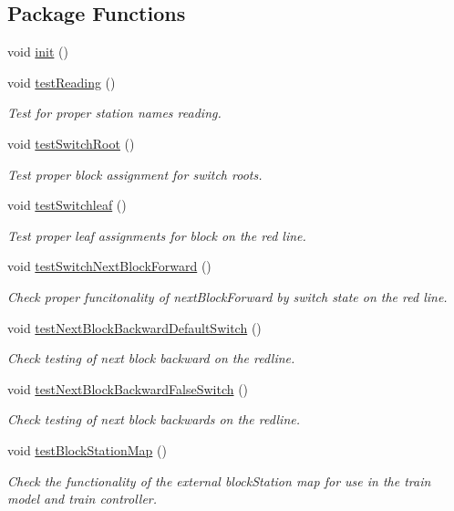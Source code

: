 \subsection*{Package Functions}
\begin{DoxyCompactItemize}
\item 
void \hyperlink{classTrackModelTest_1_1RedlineTest_a497f6628deb6bfcdacf364347d91a047}{init} ()
\item 
void \hyperlink{classTrackModelTest_1_1RedlineTest_ae4dcd25f8b5aa3ad7b8dc6ba5653fdab}{test\+Reading} ()
\begin{DoxyCompactList}\small\item\em Test for proper station names reading. \end{DoxyCompactList}\item 
void \hyperlink{classTrackModelTest_1_1RedlineTest_a44cf11f1134dd573bb7027a345fdb183}{test\+Switch\+Root} ()
\begin{DoxyCompactList}\small\item\em Test proper block assignment for switch roots. \end{DoxyCompactList}\item 
void \hyperlink{classTrackModelTest_1_1RedlineTest_a8f55cb6090b37b93a36c5af26ea04ed0}{test\+Switchleaf} ()
\begin{DoxyCompactList}\small\item\em Test proper leaf assignments for block on the red line. \end{DoxyCompactList}\item 
void \hyperlink{classTrackModelTest_1_1RedlineTest_a80a489082558d70feb6bcd9e538b259e}{test\+Switch\+Next\+Block\+Forward} ()
\begin{DoxyCompactList}\small\item\em Check proper funcitonality of next\+Block\+Forward by switch state on the red line. \end{DoxyCompactList}\item 
void \hyperlink{classTrackModelTest_1_1RedlineTest_aa09b645d2f4de7e88b8e05e82368a6d6}{test\+Next\+Block\+Backward\+Default\+Switch} ()
\begin{DoxyCompactList}\small\item\em Check testing of next block backward on the redline. \end{DoxyCompactList}\item 
void \hyperlink{classTrackModelTest_1_1RedlineTest_a2970dbaa3e66e82f5e1c6881dae59112}{test\+Next\+Block\+Backward\+False\+Switch} ()
\begin{DoxyCompactList}\small\item\em Check testing of next block backwards on the redline. \end{DoxyCompactList}\item 
void \hyperlink{classTrackModelTest_1_1RedlineTest_a16aa0b2253a86b3b4859ebadbbfc59bf}{test\+Block\+Station\+Map} ()
\begin{DoxyCompactList}\small\item\em Check the functionality of the external block\+Station map for use in the train model and train controller. \end{DoxyCompactList}\end{DoxyCompactItemize}
